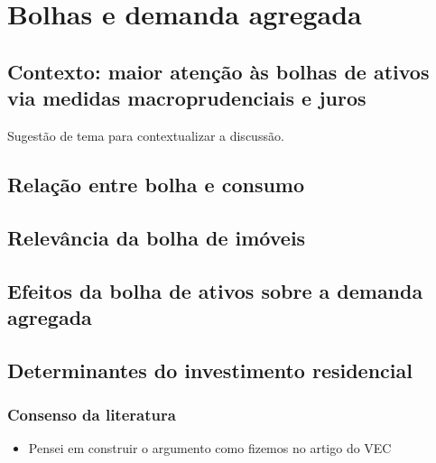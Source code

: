 \documentclass[11pt]{article}
\begin{document}


\section{Bolhas e demanda agregada}
\label{sec:org800b6e5}
\subsection{Contexto: maior atenção às bolhas de ativos via medidas macroprudenciais e juros}
\label{sec:orgba1e319}

Sugestão de tema para contextualizar a discussão.


\subsection{Relação entre bolha e consumo}
\label{sec:orgd5978ba}





\subsection{Relevância da bolha de imóveis}
\label{sec:org9d0661f}


\subsection{Efeitos da bolha de ativos sobre a demanda agregada}
\label{sec:org63d48ef}


\subsection{Determinantes do investimento residencial}
\label{sec:org7611fda}
\subsubsection{Consenso da literatura}
\label{sec:orgcb7e772}

\begin{itemize}
\item Pensei em construir o argumento como fizemos no artigo do VEC
\end{itemize}
\end{document}
